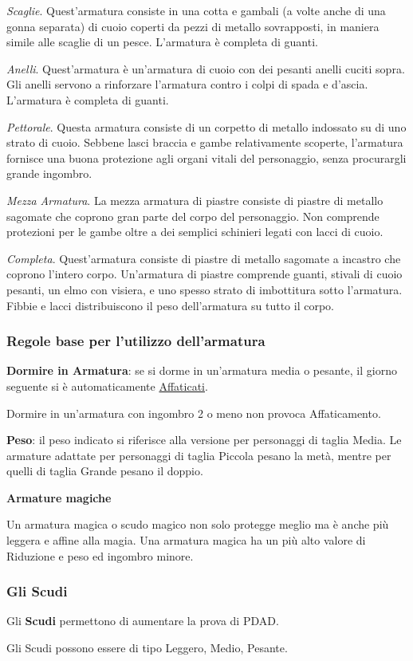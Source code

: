 \documentclass[12pt,a4paper,twoside,openany]{book}
\begin{document}
\begin{multicols}{2}
\textit{Scaglie}. Quest'armatura consiste in una cotta e gambali (a volte anche di una gonna separata) di cuoio coperti da pezzi di metallo sovrapposti, in maniera simile alle scaglie di un pesce. L'armatura è completa di guanti.

\textit{Anelli}. Quest'armatura è un'armatura di cuoio con dei pesanti anelli cuciti sopra. Gli anelli servono a rinforzare l'armatura contro i colpi di spada e d'ascia. L'armatura è completa di guanti.

\textit{Pettorale}. Questa armatura consiste di un corpetto di metallo indossato su di uno strato di cuoio. Sebbene lasci braccia e gambe relativamente scoperte, l'armatura fornisce una buona protezione agli organi vitali del personaggio, senza procurargli grande ingombro.

\textit{Mezza Armatura}. La mezza armatura di piastre consiste di piastre di metallo sagomate che coprono gran parte del corpo del personaggio. Non comprende protezioni per le gambe oltre a dei semplici schinieri legati con lacci di cuoio.

\textit{Completa}. Quest'armatura consiste di piastre di metallo sagomate a incastro che coprono l'intero corpo. Un'armatura di piastre comprende guanti, stivali di cuoio pesanti, un elmo con visiera, e uno spesso strato di imbottitura sotto l'armatura. Fibbie e lacci distribuiscono il peso dell'armatura su tutto il corpo.


\subsubsection{Regole base per l'utilizzo dell'armatura}

\textbf{Dormire in Armatura}: se si dorme in un'armatura media o pesante, il giorno seguente si è automaticamente \hyperlink{affaticato}{Affaticati}.

Dormire in un'armatura con ingombro 2 o meno non provoca Affaticamento.

\textbf{Peso}: il peso indicato si riferisce alla versione per personaggi di taglia Media. Le armature adattate per personaggi di taglia Piccola pesano la metà, mentre per quelli di taglia Grande pesano il doppio.

\textbf{Armature magiche}

Un armatura magica o scudo magico non solo protegge meglio ma è anche più leggera e affine alla magia. Una armatura magica ha un più alto valore di Riduzione e peso ed ingombro minore.

\subsubsection{Gli Scudi}

Gli \textbf{Scudi} permettono di aumentare la prova di PDAD. 

Gli Scudi possono essere di tipo Leggero, Medio, Pesante.

\end{multicols}
\end{document}
